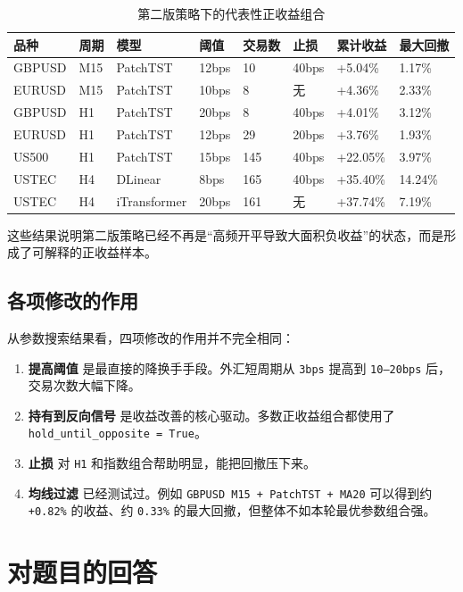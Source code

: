 \documentclass[11pt,a4paper]{ctexart}
\begin{document}
\begin{table}[htbp]
\centering
\caption{第二版策略下的代表性正收益组合}
\label{tab:improved}
\small
\begin{tabular}{C{1.7cm} C{1.1cm} C{1.7cm} C{1.1cm} C{1.0cm} C{1.0cm} C{1.6cm} C{1.5cm}}
\toprule
品种 & 周期 & 模型 & 阈值 & 交易数 & 止损 & 累计收益 & 最大回撤 \\
\midrule
GBPUSD & M15 & PatchTST     & 12bps & 10  & 40bps & +5.04\%  & 1.17\% \\
EURUSD & M15 & PatchTST     & 10bps & 8   & 无     & +4.36\%  & 2.33\% \\
GBPUSD & H1  & PatchTST     & 20bps & 8   & 40bps & +4.01\%  & 3.12\% \\
EURUSD & H1  & PatchTST     & 12bps & 29  & 20bps & +3.76\%  & 1.93\% \\
US500  & H1  & PatchTST     & 15bps & 145 & 40bps & +22.05\% & 3.97\% \\
USTEC  & H4  & DLinear      & 8bps  & 165 & 40bps & +35.40\% & 14.24\% \\
USTEC  & H4  & iTransformer & 20bps & 161 & 无     & +37.74\% & 7.19\% \\
\bottomrule
\end{tabular}
\end{table}

这些结果说明第二版策略已经不再是“高频开平导致大面积负收益”的状态，而是形成了可解释的正收益样本。

\subsection{各项修改的作用}

从参数搜索结果看，四项修改的作用并不完全相同：
\begin{enumerate}
  \item \textbf{提高阈值} 是最直接的降换手手段。外汇短周期从 \texttt{3bps} 提高到 \texttt{10--20bps} 后，交易次数大幅下降。
  \item \textbf{持有到反向信号} 是收益改善的核心驱动。多数正收益组合都使用了 \texttt{hold\_until\_opposite = True}。
  \item \textbf{止损} 对 \texttt{H1} 和指数组合帮助明显，能把回撤压下来。
  \item \textbf{均线过滤} 已经测试过。例如 \texttt{GBPUSD M15 + PatchTST + MA20} 可以得到约 \texttt{+0.82\%} 的收益、约 \texttt{0.33\%} 的最大回撤，但整体不如本轮最优参数组合强。
\end{enumerate}

\section{对题目的回答}
\end{document}
